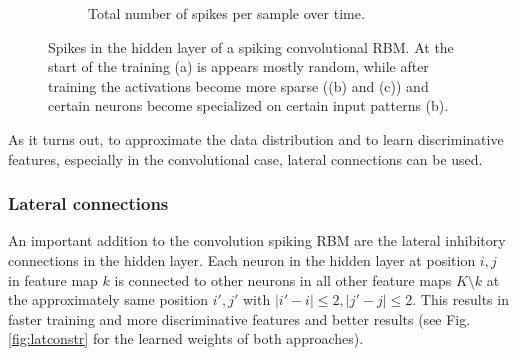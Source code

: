 \begin{figure}[h!]
\begin{subfigure}[t]{.32\textwidth}
  		\caption{Total number of spikes per sample over time.}
  		\label{fig:sub2}
	\end{subfigure}
	\caption[Spikes in the hidden layer of a spiking convolutional RBM.]{Spikes in the hidden layer of a spiking convolutional RBM. At the start of the training (a) is appears mostly random, while after training the activations become more sparse ((b) and (c))  and certain neurons become specialized on certain input patterns (b).}
	\label{fig:actdevstr}
\end{figure}

As it turns out, to approximate the data distribution and to learn discriminative features, especially in the convolutional case, lateral connections can be used.

\subsubsection{Lateral connections} \label{c:latinhibexp}

An important addition to the convolution spiking RBM are the lateral inhibitory connections in the hidden layer. 
Each neuron in the hidden layer at position $i,j$ in feature map $k$ is connected to other neurons in all other feature maps $K \setminus k$ at the approximately same position $i', j'$ with $ |i'-i| \le 2 , |j' - j| \le 2 $.   
This results in faster training and more discriminative features and better results (see Fig. \ref{fig:latconstr} for the learned weights of both approaches).

